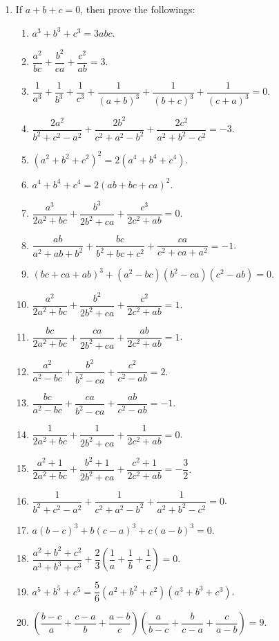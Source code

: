 \begin{enumerate}
			\item If $a+b+c=0$, then prove the followings: 
			\begin{enumerate}[label=(\alph*)]
				\item $a^3+b^3+c^3=3abc$.
				\item $\dfrac{a^2}{bc}+\dfrac{b^2}{ca}+\dfrac{c^2}{ab}=3$.
				\item $\dfrac{1}{a^3}+\dfrac{1}{b^3}+\dfrac{1}{c^3}+\dfrac{1}{(a+b)^3}+\dfrac{1}{(b+c)^3}+\dfrac{1}{(c+a)^3}=0$.
				\item $\dfrac{2a^2}{b^2+c^2-a^2}+\dfrac{2b^2}{c^2+a^2-b^2}+\dfrac{2c^2}{a^2+b^2-c^2}=-3$.
				\item $(a^2+b^2+c^2)^2=2(a^4+b^4+c^4)$.
				\item $a^4+b^4+c^4=2(ab+bc+ca)^2$.
				\item $\dfrac{a^3}{2a^2+bc}+\dfrac{b^3}{2b^2+ca}+\dfrac{c^3}{2c^2+ab}=0$.
				\item $\dfrac{ab}{a^2+ab+b^2}+\dfrac{bc}{b^2+bc+c^2}+\dfrac{ca}{c^2+ca+a^2}=-1$. %
				\item $(bc+ca+ab)^3+(a^2-bc)(b^2-ca)(c^2-ab)=0$. %
				\item $\dfrac{a^2}{2a^2+bc}+\dfrac{b^2}{2b^2+ca}+\dfrac{c^2}{2c^2+ab}=1$. %
				\item $\dfrac{bc}{2a^2+bc}+\dfrac{ca}{2b^2+ca}+\dfrac{ab}{2c^2+ab}=1$.
				\item $\dfrac{a^2}{a^2-bc}+\dfrac{b^2}{b^2-ca}+\dfrac{c^2}{c^2-ab}=2$.
				\item $\dfrac{bc}{a^2-bc}+\dfrac{ca}{b^2-ca}+\dfrac{ab}{c^2-ab}=-1$.
				\item $\dfrac{1}{2a^2+bc}+\dfrac{1}{2b^2+ca}+\dfrac{1}{2c^2+ab}=0$.
				\item $\dfrac{a^2+1}{2a^2+bc}+\dfrac{b^2+1}{2b^2+ca}+\dfrac{c^2+1}{2c^2+ab}=-\dfrac{3}{2}$.
				\item $\dfrac{1}{b^2+c^2-a^2}+\dfrac{1}{c^2+a^2-b^2}+\dfrac{1}{a^2+b^2-c^2}=0$.
				\item $a(b-c)^3+b(c-a)^3+c(a-b)^3=0$.

				\item $\dfrac{a^2+b^2+c^2}{a^3+b^3+c^3}+\dfrac{2}{3}\left(\dfrac{1}{a}+\dfrac{1}{b}+\dfrac{1}{c}\right)=0$.
				\item $a^5+b^5+c^5=\dfrac{5}{6}(a^2+b^2+c^2)(a^3+b^3+c^3)$.
				\item $\left(\dfrac{b-c}{a}+\dfrac{c-a}{b}+\dfrac{a-b}{c}\right) \left(\dfrac{a}{b-c}+\dfrac{b}{c-a}+\dfrac{c}{a-b}\right)=9$.
			

\end{enumerate}
\end{enumerate}
